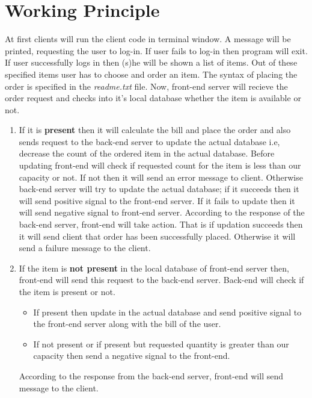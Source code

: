 \documentclass[11pt]{article}
\begin{document}
	\section{\label{section:workpri}Working Principle}
		At first clients will run the client code in terminal window. A message will be printed, requesting the user to log-in. If user fails to log-in then program will exit. If user successfully logs in then (s)he will be shown a list of items. Out of these specified items user has to choose and order an item. The syntax of placing the order is specified in the \textit{readme.txt} file. Now, front-end server will recieve the order request and checks into it’s local database whether the item is available or not.
		\begin{enumerate}
			\item If it is \textbf{present} then it will calculate the bill and place the order and also sends request to the back-end server to update the actual database i.e,
			decrease the count of the ordered item in the actual database. Before updating front-end will check if requested count for the item is less than our capacity or not. If not then it will send an error message to client.
			Otherwise back-end server will try to update the actual database; if it succeeds then it will send positive signal to the front-end server. If it fails
			to update then it will send negative signal to front-end server. According to the response of the back-end server, front-end will take action. That is if updation succeeds then it will send client that order has been successfully placed. Otherwise it will send a failure message to the client.
			\item If the item is \textbf{not present} in the local database of front-end server then, front-end will send this request to the back-end server. Back-end will check if the item is present or not.
			\begin{itemize}
				\item If present then update in the actual database and send positive signal to the front-end server along with the bill of the user.
				\item If not present or if present but requested quantity is greater than our capacity then send a negative signal to the front-end.
			\end{itemize}
			According to the response from the back-end server, front-end will send message to the client.
		\end{enumerate}
\end{document}
